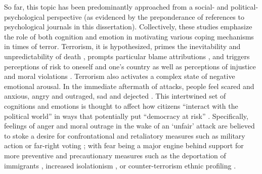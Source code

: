 

So far, this topic has been predominantly approached from a social- and political-psychological perspective (as evidenced by the preponderance of references to psychological journals in this dissertation). Collectively, these studies emphasize the role of both cognition and emotion in motivating various coping mechanisms in times of terror. Terrorism, it is hypothesized, primes the inevitability and unpredictability of death \citep{Pyszczynski2003}, prompts particular blame attributions \citep{Kimhi2009a, Sadler2005}, and triggers perceptions of risk to oneself and one's country \citep{Huddy2002a, Jost2003} as well as perceptions of injustice and moral violations \citep{Lambert2019, Skitka2002}. Terrorism also activates a complex state of negative emotional arousal. In the immediate aftermath of attacks, people feel scared and anxious, angry and outraged, sad and dejected \citep{Halperin2014, Pliskin2020}. This intertwined set of cognitions and emotions is thought to affect how citizens ``interact with the political world'' in ways that potentially put ``democracy at risk'' \citep{Merolla2009a}. Specifically, feelings of anger and moral outrage in the wake of an `unfair' attack are believed to stoke a desire for confrontational and retaliatory measures such as military action \citep{Fisk2019a, Wayne2018} or far-right voting \citep{Vasilopoulos2019c}; with fear being a major engine behind support for more preventive and precautionary measures such as the deportation of immigrants \citep{Skitka2006}, increased isolationism \citep{Huddy2005}, or counter-terrorism ethnic profiling \citep{Schildkraut2009}. 


